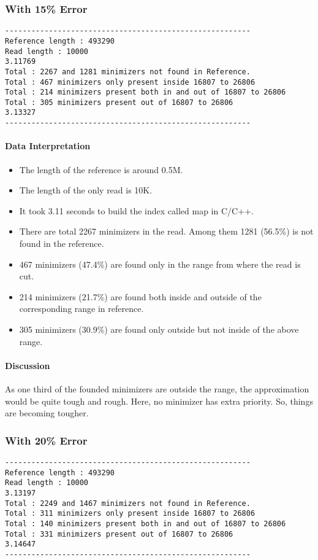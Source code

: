\documentclass{standalone}
\begin{document}
\subsubsection*{With 15\% Error}
\begin{verbatim}
--------------------------------------------------------
Reference length : 493290
Read length : 10000
3.11769
Total : 2267 and 1281 minimizers not found in Reference.
Total : 467 minimizers only present inside 16807 to 26806
Total : 214 minimizers present both in and out of 16807 to 26806
Total : 305 minimizers present out of 16807 to 26806
3.13327
--------------------------------------------------------
\end{verbatim}
\paragraph*{Data Interpretation}
\begin{itemize}
	\item The length of the reference is around 0.5M.
	\item The length of the only read is 10K.
	\item It took 3.11 seconds to build the index called map in C/C++.
	\item There are total 2267 minimizers in the read. Among them 1281 (56.5\%) is not found in the reference.
	\item 467 minimizers (47.4\%) are found only in the range from where the read is cut.
	\item 214 minimizers (21.7\%) are found both inside and outside of the corresponding range in reference.
	\item 305 minimizers (30.9\%) are found only outside but not inside of the above range.
\end{itemize}
\paragraph*{Discussion}
As one third of the founded minimizers are outside the range, the approximation would be quite tough and rough. Here, no minimizer has extra priority. So, things are becoming tougher. 
\subsubsection*{With 20\% Error}
\begin{verbatim}
--------------------------------------------------------
Reference length : 493290
Read length : 10000
3.13197
Total : 2249 and 1467 minimizers not found in Reference.
Total : 311 minimizers only present inside 16807 to 26806
Total : 140 minimizers present both in and out of 16807 to 26806
Total : 331 minimizers present out of 16807 to 26806
3.14647
--------------------------------------------------------
\end{verbatim}
\end{document}
